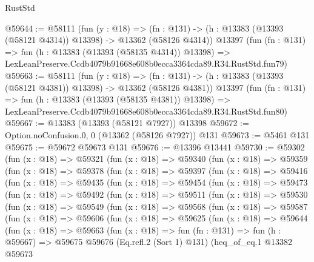 \begin{lexlean}{RustStd}
\begin{coremodule}
@59644 := @58111
    (fun (y : @18) =>
    (fn : @131) -> (h : @13383 (@13393 (@58121 @4314)) @13398) -> @13362 (@58126 @4314))
    @13397
    (fun (fn : @131) =>
    fun (h : @13383 (@13393 (@58135 @4314)) @13398) =>
    LexLeanPreserve.Ccdb4079b91668e608b0ecca3364cda89.R34.RustStd.fun79)
@59663 := @58111
    (fun (y : @18) =>
    (fn : @131) -> (h : @13383 (@13393 (@58121 @4381)) @13398) -> @13362 (@58126 @4381))
    @13397
    (fun (fn : @131) =>
    fun (h : @13383 (@13393 (@58135 @4381)) @13398) =>
    LexLeanPreserve.Ccdb4079b91668e608b0ecca3364cda89.R34.RustStd.fun80)
@59667 := @13383 (@13393 (@58121 @7927)) @13398
@59672 := Option.noConfusion.{0, 0} (@13362 (@58126 @7927)) @131
@59673 := @5461 @131
@59675 := @59672 @59673 @131
@59676 := @13396 @13441
@59730 := @59302
    (fun (x : @18) =>
    @59321
      (fun (x : @18) =>
      @59340
        (fun (x : @18) =>
        @59359
          (fun (x : @18) =>
          @59378
            (fun (x : @18) =>
            @59397
              (fun (x : @18) =>
              @59416
                (fun (x : @18) =>
                @59435
                  (fun (x : @18) =>
                  @59454
                    (fun (x : @18) =>
                    @59473
                      (fun (x : @18) =>
                      @59492
                        (fun (x : @18) =>
                        @59511
                          (fun (x : @18) =>
                          @59530
                            (fun (x : @18) =>
                            @59549
                              (fun (x : @18) =>
                              @59568
                                (fun (x : @18) =>
                                @59587
                                  (fun (x : @18) =>
                                  @59606
                                    (fun (x : @18) =>
                                    @59625
                                      (fun (x : @18) =>
                                      @59644
                                        (fun (x : @18) =>
                                        @59663
                                          (fun (x : @18) =>
                                          fun (fn : @131) =>
                                          fun (h : @59667) =>
                                          @59675
                                            @59676
                                            (Eq.refl.{2} (Sort 1) @131)
                                            (heq_of_eq.{1}
                                              @13382
                                              @59673

\end{coremodule}
\end{lexlean}
